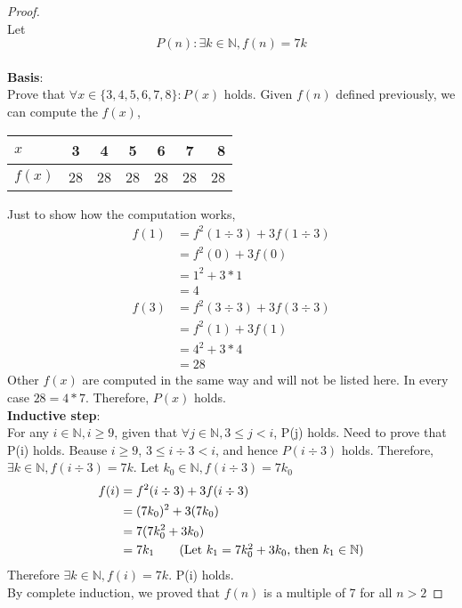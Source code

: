 \documentclass[11pt]{article}
\theoremstyle{plain}%
\theoremstyle{definition}
\theoremstyle{remark}
\newcommand{\N}{\mathbb{N}}
\begin{document}
\begin{proof}
  $ $\\
  Let
  \[
    P(n):\exists k\in \N, f(n) = 7k
  \]
  \\
  \textbf{Basis}:\\
  Prove that $\forall x\in \{3,4,5,6,7,8 \}: P(x)$ holds. Given $f(n)$ defined previously, we can compute the $f(x)$,

  \begin{center}
    \begin{tabular}{l*{5}{c}r}
      $x$              & 3 & 4 & 5 & 6 & 7  & 8 \\
      \hline
      $f(x)$           & 28 & 28 & 28 & 28 & 28 & 28   \\
    \end{tabular}
  \end{center}
  Just to show how the computation works,
  \begin{align*}
    f(1)&= f^2(1\div 3) + 3f(1\div 3) \\
    &= f^2(0) + 3f(0)\tag{$1\div 3=0$} \\
    &= 1^2 + 3*1 \tag{$f(0) = 1$} \\
    &= 4
  \end{align*}
  \begin{align*}
    f(3) &= f^2(3\div 3) + 3f(3\div 3) \\
    &= f^2(1) + 3f(1) \tag{$3\div 3 = 1$}\\
    &= 4^2 + 3*4 \tag{$f(1) = 4$} \\
    &= 28
  \end{align*}
  Other $f(x)$ are computed in the same way and will not be listed here. In every case $28 = 4*7$. Therefore, $P(x)$ holds.\\


  \textbf{Inductive step}:\\
  For any $i\in\N, i\geq 9$, given that $\forall j\in \N,  3 \leq j < i$, P(j) holds. Need to prove that P(i) holds. Beause $i\geq 9$, $ 3\leq i\div 3 < i$, and hence $P(i\div 3)$ holds. Therefore, $\exists k\in \N, f(i\div 3) = 7 k$. Let $k_0 \in\N, f(i\div 3) = 7k_0$
  \begin{align*}
    f(i) &= f^2(i \div 3) + 3f(i \div 3) \\
    &= (7k_0)^2 + 3(7k_0)\\
    &= 7(7k_0^2 + 3k_0) \\
    &= 7k_1 \tag{Let $k_1 = 7k_0^2 + 3k_0$, then $k_1\in\N$}
  \end{align*}
  Therefore $\exists k\in \N, f(i) = 7k$. P(i) holds. \\
  By complete induction, we proved that $f(n)$ is a multiple of 7 for all $n>2$

\end{proof}




\end{document}
